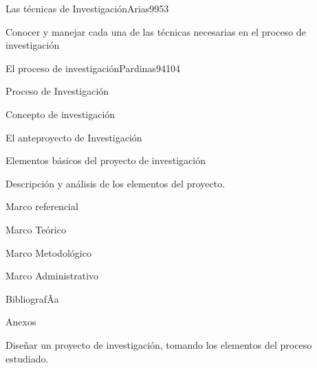 \begin{syllabus}
\begin{unit}{Las técnicas de Investigación}{Arias99}{5}{3}
   \begin{unitgoals}
      \item Conocer y manejar cada una de las técnicas necesarias en el proceso de investigación
   \end{unitgoals}
\end{unit}

\begin{unit}{El proceso de investigación}{Pardinas94}{10}{4}
   \begin{topics}
      \item Proceso de Investigación
	\item Concepto de investigación
	\item El anteproyecto de Investigación 
	\item Elementos básicos del proyecto de investigación
	\item Descripción y análisis de los elementos del proyecto.
	\item Marco referencial
	\item Marco Teórico
	\item Marco Metodológico
	\item Marco Administrativo
	\item BibliografÃ­a 
	\item Anexos
   \end{topics}

   \begin{unitgoals}
      \item Diseñar un proyecto de investigación, tomando los elementos del proceso estudiado.
   \end{unitgoals}
\end{unit}

\begin{coursebibliography}
\end{coursebibliography}
\end{syllabus}

